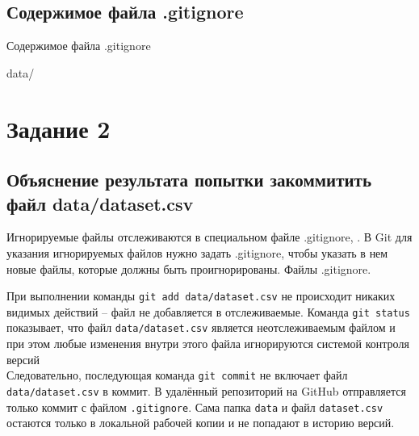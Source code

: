 \documentclass[12pt]{article}
\begin{document}
\subsection{Содержимое файла .gitignore}
\begin{algorithm}[H]
\caption{Содержимое файла .gitignore}
\begin{algorithmic}[1]
\State data/
\end{algorithmic}
\end{algorithm}

\section*{Задание 2}
\subsection{Объяснение результата попытки закоммитить файл data/dataset.csv}
Игнорируемые файлы отслеживаются в специальном файле .gitignore, . В Git  для указания игнорируемых файлов нужно задать .gitignore, чтобы указать в нем новые файлы, которые должны быть проигнорированы. Файлы .gitignore.


При выполнении команды \verb|git add data/dataset.csv| не происходит никаких видимых действий -- файл не добавляется в отслеживаемые. Команда \verb|git status|  показывает, что файл \verb|data/dataset.csv| является неотслеживаемым файлом и при этом  любые изменения внутри этого файла игнорируются системой контроля версий\\

Следовательно, последующая команда \verb|git commit| не включает файл \verb|data/dataset.csv| в коммит. В удалённый репозиторий на GitHub отправляется только коммит с файлом \verb|.gitignore|. Сама папка \verb|data| и файл \verb|dataset.csv| остаются только в локальной рабочей копии и не попадают в историю версий.
\end{document}
